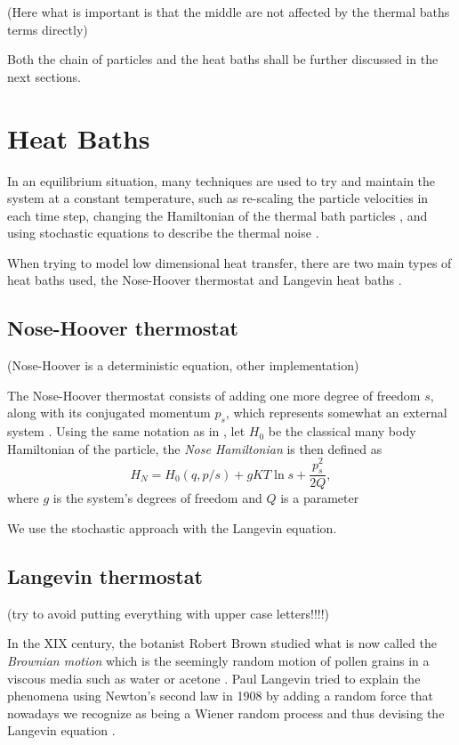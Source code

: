 (Here what is important is that the middle are not affected by the thermal baths terms directly)


Both the chain of particles and the heat baths shall be further discussed in the next sections.

\section{Heat Baths}

In an equilibrium situation, many techniques are used to try and maintain the system at a constant temperature, such as re-scaling the particle velocities in each time step, changing the Hamiltonian of the thermal bath particles \cite{noseUnifiedFormulation1984}, and using stochastic equations to describe the thermal noise \cite{lepriThermalConduction2003}.

When trying to model low dimensional heat transfer, there are two main types of heat baths used, the Nose-Hoover thermostat and Langevin heat baths \cite{lepriThermalConduction2003}.

\subsection{Nose-Hoover thermostat}

(Nose-Hoover is a deterministic equation, other implementation)

The Nose-Hoover thermostat consists of adding one more degree of freedom $ s $, along with its conjugated momentum $ p_{s} $, which represents somewhat an external system \cite{noseUnifiedFormulation1984}. Using the same notation as in \cite{evansNoseHoover1985}, let $ H_{0} $ be the classical many body Hamiltonian of the particle, the \textit{Nose Hamiltonian} is then defined as
\[ H_{N} = H_{0}(q, p/s) + gKT\ln{s} + \frac{p_{s}^{2}}{2Q}, \]
where $ g $ is the system's degrees of freedom and $ Q $ is a parameter

We use the stochastic approach with the Langevin equation. 

\subsection{Langevin thermostat}

(try to avoid putting everything with upper case letters!!!!)


In the XIX century, the botanist Robert Brown studied what is now called the \textit{Brownian motion} which is the seemingly random motion of pollen grains in a viscous media such as water or acetone \cite{nelsonDynamicalTheories2001}. Paul Langevin tried to explain the phenomena using Newton's second law in 1908 by adding a random force that nowadays we recognize as being a Wiener random process and thus devising the Langevin equation \cite{lemonsPaulLangevin1997}.

